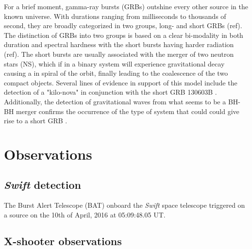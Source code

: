 \documentclass[a4paper,fleqn,usenatbib]{mnras}
\begin{document}
For a brief moment, gamma-ray bursts (GRBs) outshine every other source in the
known universe. With durations ranging from milliseconds to thousands of second,
they are broadly categorized in two groups, long- and short GRBs (ref). The
distinction of GRBs into two groups is based on a clear bi-modality in both
duration and spectral hardness with the short bursts having harder radiation
(ref). The short bursts are usually associated with the merger of two neutron
stars (NS), which if in a binary system will experience gravitational decay
causing a in spiral of the orbit, finally leading to the coalescence of the two
compact objects. Several lines of evidence in support of this model include the
detection of a "kilo-nova" in conjunction with the short GRB 130603B
\citep{Tanvir2013, Berger2013}. Additionally, the detection of gravitational
waves from what seems to be a BH-BH merger confirms the occurrence of the type
of system that could could give rise to a short GRB  \citep{Abbott2016}.
%

\section{Observations}
\label{sec:Methods} %

\subsection{\textit{Swift} detection}
The Burst Alert Telescope (BAT) onboard the \textit{Swift} space telescope
\citep{Gehrels2004} triggered on a source on the 10th of April, 2016 at
05:09:48.05 UT. \cite{Norris2011}


\subsection{X-shooter observations}
\end{document}
